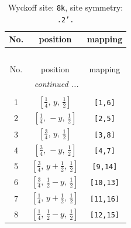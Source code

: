 \documentclass[fleqn,8pt]{jsarticle}
\begin{document}
\begin{longtable}{ccc}
\caption{Wyckoff site: {\tt 8k}, site symmetry: {\tt .2'.}}
 \\
 \hline \hline
No. & position & mapping \\ \hline \endfirsthead

\multicolumn{2}{l}{\tablename\ \thetable{}} \\
 \hline \hline
No. & position & mapping \\ \hline \endhead

 \hline \hline
\multicolumn{2}{r}{\footnotesize\it continued ...} \\ \endfoot

 \hline \hline
\multicolumn{2}{r}{} \\ \endlastfoot

1 & $\left[ \frac{1}{4},\, y,\, \frac{1}{2} \right]$ & {\tt [1,6]} \\ \hline
2 & $\left[ \frac{1}{4},\, - y,\, \frac{1}{2} \right]$ & {\tt [2,5]} \\ \hline
3 & $\left[ \frac{3}{4},\, y,\, \frac{1}{2} \right]$ & {\tt [3,8]} \\ \hline
4 & $\left[ \frac{3}{4},\, - y,\, \frac{1}{2} \right]$ & {\tt [4,7]} \\ \hline
5 & $\left[ \frac{3}{4},\, y + \frac{1}{2},\, \frac{1}{2} \right]$ & {\tt [9,14]} \\ \hline
6 & $\left[ \frac{3}{4},\, \frac{1}{2} - y,\, \frac{1}{2} \right]$ & {\tt [10,13]} \\ \hline
7 & $\left[ \frac{1}{4},\, y + \frac{1}{2},\, \frac{1}{2} \right]$ & {\tt [11,16]} \\ \hline
8 & $\left[ \frac{1}{4},\, \frac{1}{2} - y,\, \frac{1}{2} \right]$ & {\tt [12,15]} \\
\end{longtable}
\renewcommand{\arraystretch}{1.2}
\end{document}
